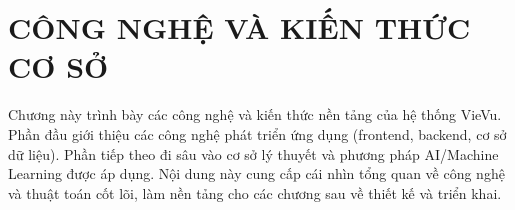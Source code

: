 \chapter{CÔNG NGHỆ VÀ KIẾN THỨC CƠ SỞ}
Chương này trình bày các công nghệ và kiến thức nền tảng của hệ thống VieVu. Phần đầu giới thiệu các công nghệ phát triển ứng dụng (frontend, backend, cơ sở dữ liệu). Phần tiếp theo đi sâu vào cơ sở lý thuyết và phương pháp AI/Machine Learning được áp dụng. Nội dung này cung cấp cái nhìn tổng quan về công nghệ và thuật toán cốt lõi, làm nền tảng cho các chương sau về thiết kế và triển khai.



